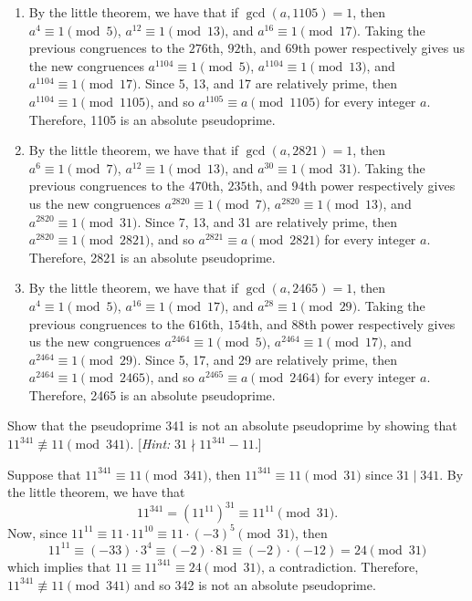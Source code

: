 \begin{solution}
    \begin{enumerate}
        \item By the little theorem, we have that if $\gcd(a, 1105) = 1$, then $a^{4} \equiv 1 \pmod 5$, $a^{12} \equiv 1 \pmod{13}$, and $a^{16} \equiv 1 \pmod{17}$. Taking the previous congruences to the $276$th, $92$th, and $69$th power respectively gives us the new congruences $a^{1104} \equiv 1 \pmod 5$, $a^{1104} \equiv 1 \pmod{13}$, and $a^{1104} \equiv 1 \pmod{17}$. Since 5, 13, and 17 are relatively prime, then $a^{1104} \equiv 1 \pmod{1105}$, and so $a^{1105} \equiv a \pmod{1105}$ for every integer $a$. Therefore, 1105 is an absolute pseudoprime.
        \item By the little theorem, we have that if $\gcd(a, 2821) = 1$, then $a^{6} \equiv 1 \pmod 7$, $a^{12} \equiv 1 \pmod{13}$, and $a^{30} \equiv 1 \pmod{31}$. Taking the previous congruences to the $470$th, $235$th, and $94$th power respectively gives us the new congruences $a^{2820} \equiv 1 \pmod 7$, $a^{2820} \equiv 1 \pmod{13}$, and $a^{2820} \equiv 1 \pmod{31}$. Since 7, 13, and 31 are relatively prime, then $a^{2820} \equiv 1 \pmod{2821}$, and so $a^{2821} \equiv a \pmod{2821}$ for every integer $a$. Therefore, 2821 is an absolute pseudoprime.
        \item By the little theorem, we have that if $\gcd(a, 2465) = 1$, then $a^{4} \equiv 1 \pmod 5$, $a^{16} \equiv 1 \pmod{17}$, and $a^{28} \equiv 1 \pmod{29}$. Taking the previous congruences to the $616$th, $154$th, and $88$th power respectively gives us the new congruences $a^{2464} \equiv 1 \pmod 5$, $a^{2464} \equiv 1 \pmod{17}$, and $a^{2464} \equiv 1 \pmod{29}$. Since 5, 17, and 29 are relatively prime, then $a^{2464} \equiv 1 \pmod{2465}$, and so $a^{2465} \equiv a \pmod{2464}$ for every integer $a$. Therefore, 2465 is an absolute pseudoprime. \\
    \end{enumerate}
\end{solution}

\begin{exercise}
    Show that the pseudoprime 341 is not an absolute pseudoprime by showing that $11^{341} \not\equiv 11 \pmod{341}$. [\textit{Hint:} $31 \nmid 11^{341} - 11$.] \\
\end{exercise}

\begin{solution}
    Suppose that $11^{341} \equiv 11 \pmod{341}$, then $11^{341} \equiv 11 \pmod{31}$ since $31 \mid 341$. By the little theorem, we have that 
    $$11^{341} = (11^{11})^{31} \equiv 11^{11} \pmod{31}.$$
    Now, since $11^{11} \equiv 11 \cdot 11^{10} \equiv 11 \cdot (-3)^5 \pmod{31}$, then
    $$11^{11} \equiv (-33) \cdot 3^4 \equiv (-2)\cdot 81 \equiv (-2) \cdot (-12) = 24 \pmod{31}$$
    which implies that $11 \equiv 11^{341} \equiv 24 \pmod{31}$, a contradiction. Therefore, $11^{341} \not\equiv 11 \pmod{341}$ and so 342 is not an absolute pseudoprime. \\
\end{solution}

